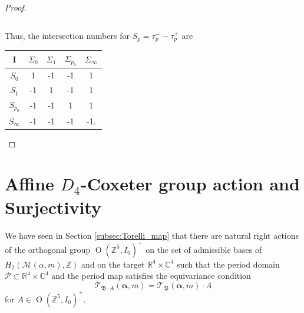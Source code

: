 \documentclass[12pt,letterpaper,reqno]{amsart}
\def\bm#1{#1}%
\def\mathbf#1{#1}%
\theoremstyle{remark}
\theoremstyle{definition}
\numberwithin{thm}{section}
\numberwithin{equation}{section}
\numberwithin{figure}{section}
\newcommand{\R}{\ensuremath{\mathbb R}}
\newcommand{\C}{\ensuremath{\mathbb C}}
\newcommand{\Z}{\ensuremath{\mathbb Z}}
\newcommand{\bfalpha}{\ensuremath{\bm \alpha}}
\newcommand{\calP}{\mathcal P}
\newcommand{\calM}{\mathcal M}
\newcommand{\bfm}{\mathbf{m}}
\DeclareMathOperator{\OO}{O}
\begin{document}
\begin{proof}
\begin{center}
\begin{tabular}{l c r}
\end{tabular}

\end{center}

Thus, the intersection numbers for $S_p = \tau_p^--\tau_p^+$ are 

\begin{center}

 \begin{tabular}{  c | c | c |c|c }
    I & $\Sigma_0$ & $\Sigma_1$ & $\Sigma_{p_0}$ & $\Sigma_\infty$ \\ \hline
    $S_0$ & 1 & -1 & -1 & 1\\ \hline
    $S_1$ & -1 & 1 & -1 & 1\\ \hline
    $S_{p_0}$ & -1 & -1  & 1 & 1\\ \hline
    $S_\infty$ & -1 & -1  & -1 & -1. \\
\end{tabular}

\end{center}

\end{proof}
\section{Affine \texorpdfstring{$D_4$}{D4}-Coxeter group action and Surjectivity} \label{sec:Dehntwists}


We have seen in Section \ref{subsec:Torelli_map} that there are natural right actions of the orthogonal group $\OO(\Z^5,I_0)^+$ on the set of admissible bases of $H_2(\calM(\bfalpha,\bfm),\Z)$ and on the target $\R^4 \times \C^4$  such that the period domain $\calP \subset \R^4 \times \C^4$ and the period map satisfies the equivariance condition
\[
\mathcal{T}_{\mathfrak{B} \cdot A}( \boldsymbol{\alpha}, \mathbf{m})= \mathcal{T}_{\mathfrak{B} }( \boldsymbol{\alpha}, \mathbf{m})\cdot A
\]	
for $A \in \OO(\Z^5,I_0)^+$. 
\end{document}
